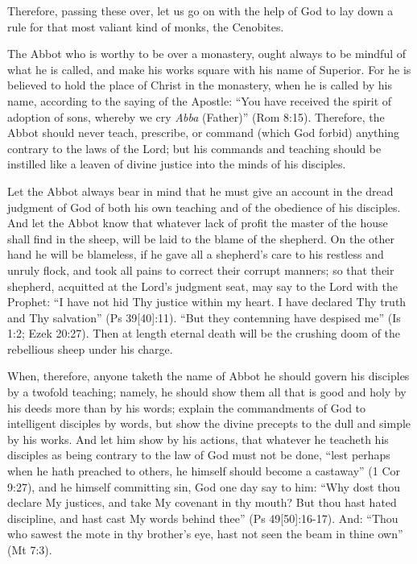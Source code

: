 Therefore, passing these over, let us go on with the help of God to lay down a rule for that most valiant kind of monks, the Cenobites.


The Abbot who is worthy to be over a monastery, ought always to be mindful of what he is called, and make his works square with his name of Superior. For he is believed to hold the place of Christ in the monastery, when he is called by his name, according to the saying of the Apostle: ``You have received the spirit of adoption of sons, whereby we cry \emph{Abba} (Father)'' (Rom 8:15). Therefore, the Abbot should never teach, prescribe, or command (which God forbid) anything contrary to the laws of the Lord; but his commands and teaching should be instilled like a leaven of divine justice into the minds of his disciples.

Let the Abbot always bear in mind that he must give an account in the dread judgment of God of both his own teaching and of the obedience of his disciples. And let the Abbot know that whatever lack of profit the master of the house shall find in the sheep, will be laid to the blame of the shepherd. On the other hand he will be blameless, if he gave all a shepherd's care to his restless and unruly flock, and took all pains to correct their corrupt manners; so that their shepherd, acquitted at the Lord's judgment seat, may say to the Lord with the Prophet: ``I have not hid Thy justice within my heart. I have declared Thy truth and Thy salvation'' (Ps 39[40]:11). ``But they contemning have despised me'' (Is 1:2; Ezek 20:27). Then at length eternal death will be the crushing doom of the rebellious sheep under his charge.

When, therefore, anyone taketh the name of Abbot he should govern his disciples by a twofold teaching; namely, he should show them all that is good and holy by his deeds more than by his words; explain the commandments of God to intelligent disciples by words, but show the divine precepts to the dull and simple by his works. And let him show by his actions, that whatever he teacheth his disciples as being contrary to the law of God must not be done, ``lest perhaps when he hath preached to others, he himself should become a castaway'' (1 Cor 9:27), and he himself committing sin, God one day say to him: ``Why dost thou declare My justices, and take My covenant in thy mouth? But thou hast hated discipline, and hast cast My words behind thee'' (Ps 49[50]:16-17). And: ``Thou who sawest the mote in thy brother's eye, hast not seen the beam in thine own'' (Mt 7:3).

